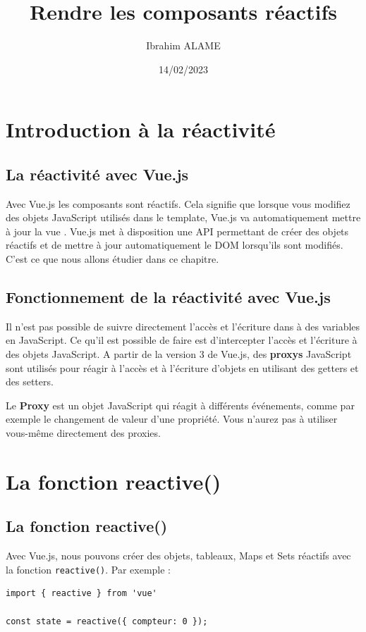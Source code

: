\documentclass{article}
\title{Rendre les composants réactifs}
\author{Ibrahim ALAME}
\date{14/02/2023}
\begin{document}
\maketitle

\section{Introduction à la réactivité}
\subsection{La réactivité avec {\color{monOrange}Vue.js}}
Avec {\color{monOrange}Vue.js} les composants sont réactifs. Cela signifie que lorsque vous modifiez des objets JavaScript utilisés dans le template, {\color{monOrange}Vue.js} va automatiquement mettre à jour la vue . {\color{monOrange}Vue.js} met à disposition une API permettant de créer des objets réactifs et de mettre à jour automatiquement le DOM lorsqu'ils sont modifiés. C'est ce que nous allons étudier dans ce chapitre.

\subsection{Fonctionnement de la réactivité avec {\color{monOrange}Vue.js}}
Il n'est pas possible de suivre directement l'accès et l'écriture dans à des variables en JavaScript. Ce qu'il est possible de faire est d'intercepter l'accès et l'écriture à des objets JavaScript. A partir de la version 3 de {\color{monOrange}Vue.js}, des {\bf proxys} JavaScript sont utilisés pour réagir à l'accès et à l'écriture d'objets en utilisant des getters et des setters.

Le {\bf Proxy} est un objet JavaScript qui réagit à différents événements, comme par exemple le changement de valeur d'une propriété. Vous n'aurez pas à utiliser vous-même directement des proxies.


\section{La fonction reactive()}
\subsection{La fonction {\color{monOrange}reactive()}}
Avec {\color{monOrange}Vue.js}, nous pouvons créer des objets, tableaux, {\color{monOrange}Maps} et {\color{monOrange}Sets} réactifs avec la fonction {\tt reactive()}. Par exemple :
\begin{verbatim}
import { reactive } from 'vue'

const state = reactive({ compteur: 0 });
\end{verbatim}
\end{document}
